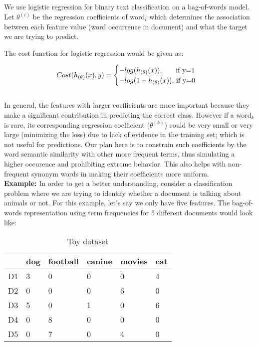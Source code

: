 We use logistic regression for binary text classification on a bag-of-words model. Let $\theta^{(i)}$ be the regression coefficients of word$_{i}$ which determines the association between each feature value (word occurrence in document) and what the target we are trying to predict.

\noindent The cost function for logistic regression would be given as:

\begin{equation}\label{lr_cost_fn_eq}
Cost(h_{(\theta)}(x), y) = 
\begin{cases}
-log(h_{(\theta)}(x)), $\qquad if y=1$
\\
-log(1-h_{(\theta)}(x)), $ if y=0$
\end{cases}
\end{equation}\\

In general, the features with larger coefficients are more important because they make a significant contribution in predicting the correct class. However if a word$_{k}$ is rare, its corresponding regression coefficient ($\theta^{(k)}$) could be very small or very large (minimizing the loss) due to lack of evidence in the training set; which is not useful for predictions. Our plan here is to constrain such coefficients by the word semantic similarity with other more frequent terms, thus simulating a higher occurence and prohibiting extreme behavior. This also helps with non-frequent synonym words in making their coefficients more uniform. \\

\noindent \textbf{Example:} In order to get a better understanding, consider a classification problem where we are trying to identify whether a document is talking about animals or not. For this example, let's say we only have five features. The bag-of-words representation using term frequencies for 5 different documents would look like:

\begin{table}[htbp]
\centering
\begin{tabular}{l|lllll}
 & dog & \multicolumn{1}{c}{football} & \multicolumn{1}{c}{canine} & movies & cat \\\hline
D1 & 3 & 0 & 0 & 0 & 4 \\
D2 & 0 & 0 & 0 & 6 & 0 \\
D3 & 5 & 0 & 1 & 0 & 6 \\
D4 & 0 & 8 & 0 & 0 & 0 \\
D5 & 0 & 7 & 0 & 4 & 0
\end{tabular}
\caption{Toy dataset}
\end{table}

